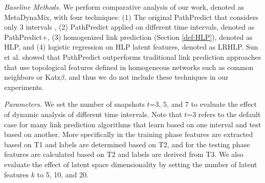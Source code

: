 





\textit{Baseline Methods.} We perform comparative analysis of our work, denoted as {MetaDynaMix}, with four techniques: (1) The original {PathPredict} that considers only 3 intervals \cite{sun2011ASONAM}, (2) PathPredict applied on different time intervals, denoted as {PathPredict+}, (3) homogenized link prediction (Section \ref{def:HLP}), denoted as {HLP}, and (4) logistic regression on HLP latent features, denoted as {LRHLP}. %
Sun et al. \cite{sun2011ASONAM} showed that {PathPredict} outperforms traditional link prediction approaches that use topological features defined in homogeneous networks such as common neighbors or Katz$\beta$, and thus we do not include these techniques in our experiments.




\textit{Parameters.} We set the number of snapshots $t$=3, 5, and 7 to evaluate the effect of dynamic analysis of different time intervals. Note that $t$=3 refers to the default case for many link prediction algorithms that learn based on one interval and test based on another. More specifically in the training phase features are extracted based on T1 and labels are determined based on T2, and for the testing phase features are calculated based on T2 and labels are derived from T3. We also evaluate the effect of latent space dimensionality by setting the number of latent features $k$ to 5, 10, and 20.

